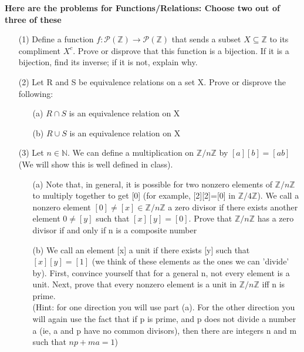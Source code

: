 \documentclass[answers,12pt]{exam}
\newcommand{\br}{\hfill \break}
\newcommand{\Z}{\mathbb{Z}}
\newcommand{\N}{\mathbb{N}}
\newcommand{\bs}{\begin{solution}}
\newcommand{\es}{\end{solution}}
\begin{document}
\br\textbf{Here are the problems for Functions/Relations: Choose two out of three of these}
\begin{enumerate}
    \item [(1)] Define a function \(f: \mathcal{P}(\Z) \to \mathcal{P}(\Z)\) that sends a subset \(X \subseteq \Z\) to its compliment \(X^ c\). Prove or disprove that this function is a bijection. If it is a bijection, find its inverse; if it is not, explain why.
    \bs
    \es
    
    \item [(2)] Let R and S be equivalence relations on a set X. Prove or disprove the following: \begin{enumerate}
        \item [(a)] \(R \cap S\) is an equivalence relation on X
        \item [(b)] \(R \cup S\) is an equivalence relation on X
    \end{enumerate}
    \bs
    \es
    \item [(3)] Let \(n \in \N\). We can define a multiplication on \(\Z/n\Z\) by \([a][b]=[ab]\) (We will show this is well defined in class). \begin{enumerate}
        \item [(a)] Note that, in general, it is possible for two nonzero elements of \(\Z/n\Z\) to multiply together to get [0] (for example, [2][2]=[0] in \(\Z/4\Z\)). We call a nonzero element \([0] \ne [x] \in \Z/n\Z\) a zero divisor if there exists another element \(0 \ne [y]\) such that \([x][y] = [0]\). Prove that \(\Z/n\Z\) has a zero divisor if and only if n is a composite number 
        \item [(b)] We call an element [x] a unit if there exists [y] such that \([x][y]=[1]\) (we think of these elements as the ones we can 'divide' by). First, convince yourself that for a general n, not every element is a unit. Next, prove that every nonzero element is a unit in \(\Z/n\Z\) iff n is prime. \\
        (Hint: for one direction you will use part (a). For the other direction you will again use the fact that if p is prime, and p does not divide a number a (ie, a and p have no common divisors), then there are integers n and m such that \(np + ma = 1\))
    \end{enumerate}
    \bs
    \es
\end{enumerate}

\br
\end{document}
